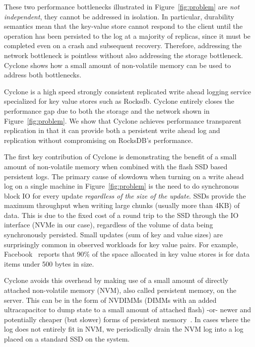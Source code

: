 \documentclass[twocolumn]{article}
\begin{document}
These two performance bottlenecks illustrated in Figure~\ref{fig:problem} are
\emph{not independent}, they cannot be addressed in isolation. In particular,
durability semantics mean that the key-value store cannot respond to the client
until the operation has been persisted to the log at a majority of replicas,
since it must be completed even on a crash and subsequent recovery. Therefore,
addressing the network bottleneck is pointless without also addressing the
storage bottleneck. Cyclone shows how a small amount of non-volatile memory can
be used to address both bottlenecks.

Cyclone is a high speed strongly consistent replicated write ahead logging
service specialized for key value stores such as Rocksdb. Cyclone entirely
closes the performance gap due to both the storage and the network shown in
Figure~\ref{fig:problem}. We show that Cyclone achieves performance transparent
replication in that it can provide both a persistent write ahead log and
replication without compromising on RocksDB's performance.

The first key contribution of Cyclone is demonstrating the benefit of a small
amount of non-volatile memory when combined with the flash SSD based persistent
logs.  The primary cause of slowdown when turning on a write ahead log on a
single machine in Figure~\ref{fig:problem} is the need to do synchronous block
IO for every update \emph{regardless of the size of the update}. SSDs provide
the maximum throughput when writing large chunks (usually more than 4KB) of
data. This is due to the fixed cost of a round trip to the SSD through the IO
interface (NVMe in our case), regardless of the volume of data being
synchronously persisted. Small updates (sum of key and value sizes) are
surprisingly common in observed workloads for key value pairs. For example,
Facebook~\cite{fb_workload_analysis} reports that 90\% of the space allocated in
key value stores is for data items under 500 bytes in size.

Cyclone avoids this overhead by making use of a small amount of directly
attached non-volatile memory (NVM), also called persistent memory, on the
server.  This can be in the form of NVDIMMs (DIMMs with an added ultracapacitor
to dump state to a small amount of attached flash) -or- newer and potentially
cheaper (but slower) forms of persistent memory~\cite{pmfs}.
In cases where the log does not entirely fit in NVM, we periodically drain the
NVM log into a log placed on a standard SSD on the system.
\end{document}
